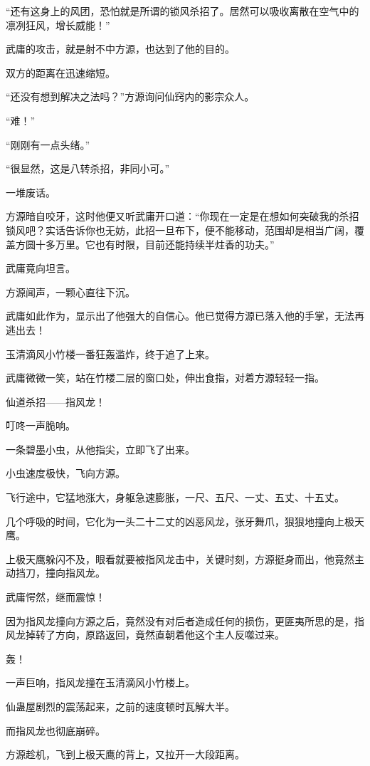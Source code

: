 \begin{this_body}
“还有这身上的风团，恐怕就是所谓的锁风杀招了。居然可以吸收离散在空气中的凛冽狂风，增长威能！”

武庸的攻击，就是射不中方源，也达到了他的目的。

双方的距离在迅速缩短。

“还没有想到解决之法吗？”方源询问仙窍内的影宗众人。

“难！”

“刚刚有一点头绪。”

“很显然，这是八转杀招，非同小可。”

一堆废话。

方源暗自咬牙，这时他便又听武庸开口道：“你现在一定是在想如何突破我的杀招锁风吧？实话告诉你也无妨，此招一旦布下，便不能移动，范围却是相当广阔，覆盖方圆十多万里。它也有时限，目前还能持续半炷香的功夫。”

武庸竟向坦言。

方源闻声，一颗心直往下沉。

武庸如此作为，显示出了他强大的自信心。他已觉得方源已落入他的手掌，无法再逃出去！

玉清滴风小竹楼一番狂轰滥炸，终于追了上来。

武庸微微一笑，站在竹楼二层的窗口处，伸出食指，对着方源轻轻一指。

仙道杀招——指风龙！

叮咚一声脆响。

一条碧墨小虫，从他指尖，立即飞了出来。

小虫速度极快，飞向方源。

飞行途中，它猛地涨大，身躯急速膨胀，一尺、五尺、一丈、五丈、十五丈。

几个呼吸的时间，它化为一头二十二丈的凶恶风龙，张牙舞爪，狠狠地撞向上极天鹰。

上极天鹰躲闪不及，眼看就要被指风龙击中，关键时刻，方源挺身而出，他竟然主动挡刀，撞向指风龙。

武庸愕然，继而震惊！

因为指风龙撞向方源之后，竟然没有对后者造成任何的损伤，更匪夷所思的是，指风龙掉转了方向，原路返回，竟然直朝着他这个主人反噬过来。

轰！

一声巨响，指风龙撞在玉清滴风小竹楼上。

仙蛊屋剧烈的震荡起来，之前的速度顿时瓦解大半。

而指风龙也彻底崩碎。

方源趁机，飞到上极天鹰的背上，又拉开一大段距离。


\end{this_body}
